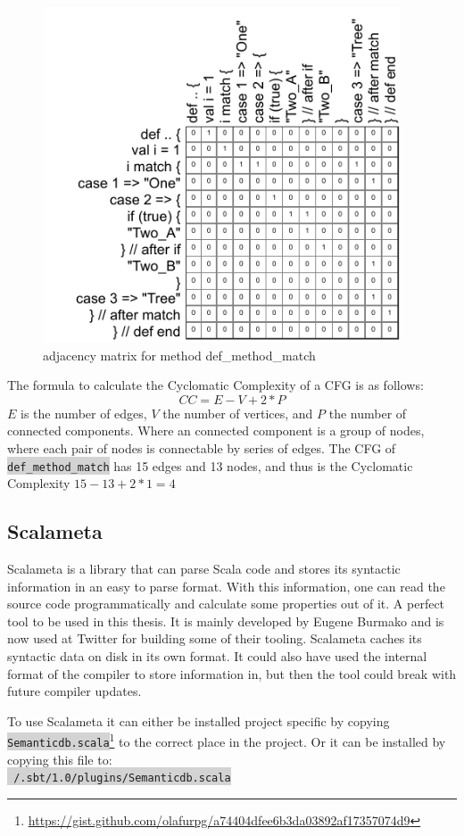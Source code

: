 \documentclass[onecolumn]{article}
\newcommand{\code}[1]{\colorbox{lightgray}{\texttt{#1}}}
\begin{document}
\begin{figure}[H]
  \centering
  \includegraphics[width=300pt]{fig/adjacency_matrix.pdf}
  \caption{adjacency matrix for method def\_method\_match}
  \label{fig:adjacency_matrix}
\end{figure}


The formula to calculate the Cyclomatic Complexity of a CFG is as follows:
\[ CC = E - V + 2 * P \]
$E$ is the number of edges, $V$ the number of vertices, and $P$ the number of connected components. Where an connected component is a group of nodes, where each pair of nodes is connectable by series of edges. The CFG of \code{def\_method\_match} has 15 edges and 13 nodes, and thus is the Cyclomatic Complexity $15 - 13 + 2 * 1 = 4$


\subsection{Scalameta} \label{section_scalameta}
Scalameta is a library that can parse Scala code and stores its syntactic information in an easy to parse format. With this information, one can read the source code programmatically and calculate some properties out of it. A perfect tool to be used in this thesis. It is mainly developed by Eugene Burmako \cite{GithubScalametaContributers} and is now used at Twitter for building some of their tooling. Scalameta caches its syntactic data on disk in its own format. It could also have used the internal format of the compiler to store information in, but then the tool could break with future compiler updates.

To use Scalameta it can either be installed project specific by copying \code{Semanticdb.scala}\footnote{\url{https://gist.github.com/olafurpg/a74404dfee6b3da03892af17357074d9}} to the correct place in the project. Or it can be installed by copying this file to:\\ \code{~/.sbt/1.0/plugins/Semanticdb.scala}
\end{document}
